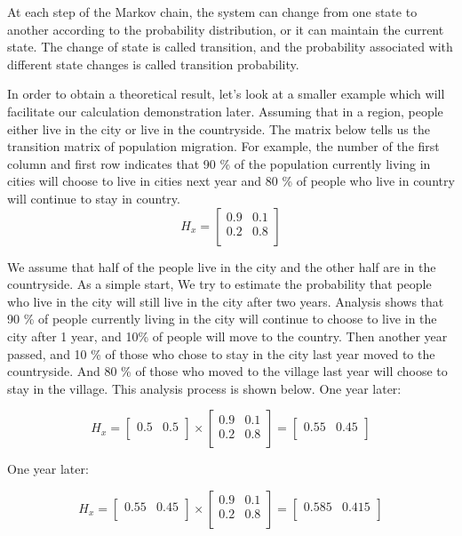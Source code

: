 At each step of the Markov chain, the system can change from one state to another according to the probability distribution, or it can maintain the current state. The change of state is called transition, and the probability associated with different state changes is called transition probability.

In order to obtain a theoretical result, let's look at a smaller example which will facilitate our  calculation demonstration later. Assuming that in a region, people either live in the city or live in the countryside. The matrix below tells us the transition matrix of population migration. For example, the number of the first column  and first row indicates that 90 \% of the population currently living in cities will choose to  live in cities next year and 80 \% of people who live in country will continue to stay in country.
$$
H_x={
\left[ \begin{array}{ccc}
0.9 & 0.1 \\
0.2 & 0.8\\
\end{array}
\right ]}
$$

We assume that half of the people live in the city and the other half are in the countryside. As a simple start, We try to estimate the probability that people who live in the city will still live in the city after two years. Analysis shows that 90 \% of people currently living in the city will continue to choose to live in the city after 1 year, and 10\% of people will move to the country. Then another year passed, and 10 \% of those who chose to stay in the city last year moved to the countryside. And 80 \% of those who moved to the village last year will choose to stay in the village. This analysis process is shown  below.
One year later:

$$
H_x=  {
\left[ \begin{array}{ccc}
0.5  & 0.5 \\
\end{array}
\right ]}
\times{
\left[ \begin{array}{ccc}
0.9 & 0.1 \\
0.2 & 0.8\\
\end{array}
\right ]}
=
{
\left[ \begin{array}{ccc}
0.55 & 0.45 \\
\end{array}
\right ]}
$$

One year later:

$$
H_x=  {
\left[ \begin{array}{ccc}
0.55 & 0.45 \\
\end{array}
\right ]}
\times{
\left[ \begin{array}{ccc}
0.9 & 0.1 \\
0.2 & 0.8\\
\end{array}
\right ]}
=
{
\left[ \begin{array}{ccc}
0.585 & 0.415 \\
\end{array}
\right ]}
$$

